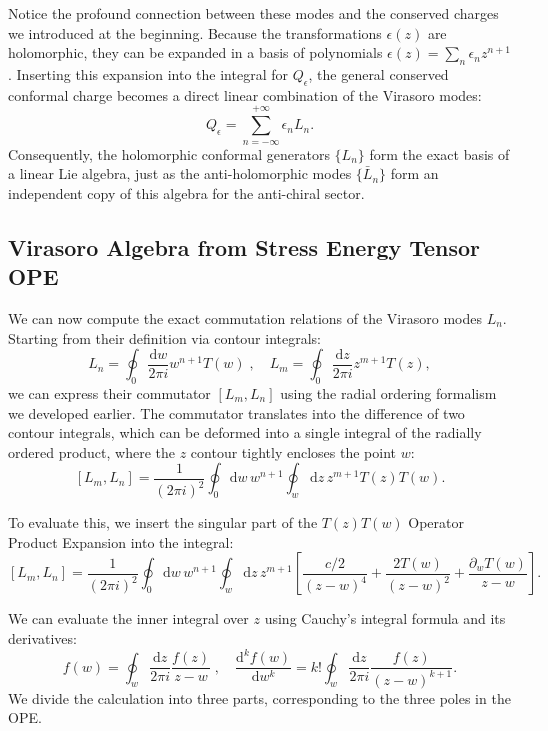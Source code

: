 Notice the profound connection between these modes and the conserved charges we introduced at the beginning. Because the transformations \(\epsilon(z)\) are holomorphic, they can be expanded in a basis of polynomials \(\epsilon(z) = \sum_{n} \epsilon_n z^{n+1}\). Inserting this expansion into the integral for \(Q_{\epsilon}\), the general conserved conformal charge becomes a direct linear combination of the Virasoro modes:
\begin{equation}
    Q_{\epsilon} = \sum_{n=-\infty}^{+\infty} \epsilon_n L_n.
    \label{eq:conformal_charge_virasoro}
\end{equation}
Consequently, the holomorphic conformal generators \(\{L_n\}\) form the exact basis of a linear Lie algebra, just as the anti-holomorphic modes \(\{\bar{L}_n\}\) form an independent copy of this algebra for the anti-chiral sector.

\subsection{Virasoro Algebra from Stress Energy Tensor OPE}

We can now compute the exact commutation relations of the Virasoro modes \(L_n\). Starting from their definition via contour integrals:
\[
    L_n = \oint_0 \frac{\mathrm{d}w}{2\pi i} w^{n+1} T(w) \;, \quad L_m = \oint_0 \frac{\mathrm{d}z}{2\pi i} z^{m+1} T(z),
\]
we can express their commutator \([L_m, L_n]\) using the radial ordering formalism we developed earlier. The commutator translates into the difference of two contour integrals, which can be deformed into a single integral of the radially ordered product, where the \(z\) contour tightly encloses the point \(w\):
\[
    [L_m, L_n] = \frac{1}{(2\pi i)^2} \oint_0 \mathrm{d}w \, w^{n+1} \oint_w \mathrm{d}z \, z^{m+1} T(z)T(w).
\]

To evaluate this, we insert the singular part of the \(T(z)T(w)\) Operator Product Expansion into the integral:
\[
    [L_m, L_n] = \frac{1}{(2\pi i)^2} \oint_0 \mathrm{d}w \, w^{n+1} \oint_w \mathrm{d}z \, z^{m+1} \left[ \frac{c/2}{(z-w)^4} + \frac{2T(w)}{(z-w)^2} + \frac{\partial_w T(w)}{z-w} \right].
\]

We can evaluate the inner integral over \(z\) using Cauchy's integral formula and its derivatives:
\[
    f(w) = \oint_w \frac{\mathrm{d}z}{2\pi i} \frac{f(z)}{z-w} \;, \quad \frac{\mathrm{d}^k f(w)}{\mathrm{d}w^k} = k! \oint_w \frac{\mathrm{d}z}{2\pi i} \frac{f(z)}{(z-w)^{k+1}}.
\]
We divide the calculation into three parts, corresponding to the three poles in the OPE.

